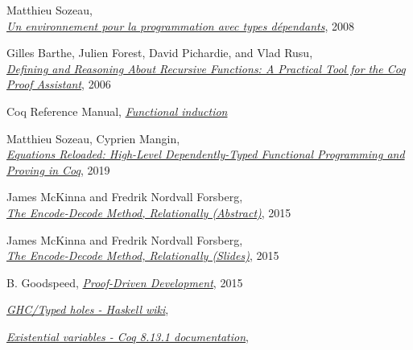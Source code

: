 \documentclass[declaration,mgr,english,shortabstract]{iithesis}
\begin{document}
\begin{thebibliography}{1}
    Matthieu Sozeau, \\
    \href{https://www.irif.fr/~sozeau/research/publications/thesis-sozeau.pdf}{\textit{Un environnement pour la programmation avec types d\'{e}pendants}},
    2008

    Gilles Barthe, Julien Forest, David Pichardie, and Vlad Rusu, \\
    \href{https://www.researchgate.net/publication/48415012_Defining_and_Reasoning_About_Recursive_Functions_A_Practical_Tool_for_the_Coq_Proof_Assistant}{\textit{Defining and Reasoning About Recursive Functions: A Practical Tool for the Coq Proof Assistant}},
    2006

    Coq Reference Manual,
    \href{https://coq.inria.fr/refman/using/libraries/funind.html}{\textit{Functional induction}}

    Matthieu Sozeau, Cyprien Mangin, \\
    \href{https://www.irif.fr/~sozeau//research/publications/Equations_Reloaded-ICFP19.pdf}{\textit{Equations Reloaded: High-Level Dependently-Typed Functional Programming and Proving in Coq}},
    2019

    James McKinna and Fredrik Nordvall Forsberg, \\
    \href{http://cs.ioc.ee/types15/abstracts-book/contrib27.pdf}{\textit{The Encode-Decode Method, Relationally (Abstract)}},
    2015

    James McKinna and Fredrik Nordvall Forsberg, \\
    \href{https://personal.cis.strath.ac.uk/fredrik.nordvall-forsberg/talks/stp_dundee_2015/stp_dundee_2015-10-07.pdf}{\textit{The Encode-Decode Method, Relationally (Slides)}},
    2015

    B. Goodspeed,
    \href{https://arxiv.org/pdf/1512.02102.pdf}{\textit{Proof-Driven Development}}, 2015

    \href{https://wiki.haskell.org/GHC/Typed_holes}{\textit{GHC/Typed holes - Haskell wiki}}, \\

    \href{https://coq.inria.fr/refman/language/extensions/evars.html}{\textit{Existential variables - Coq 8.13.1 documentation}}, \\


\end{thebibliography}
\end{document}
